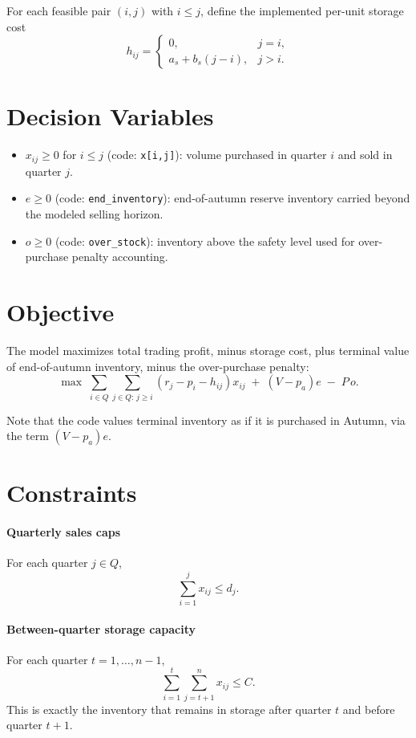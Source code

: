 For each feasible pair $(i,j)$ with $i \le j$, define the implemented per-unit storage cost
\[
h_{ij}=
\begin{cases}
0, & j=i,\\
a_s + b_s (j-i), & j>i.
\end{cases}
\]

\section*{Decision Variables}

\begin{itemize}
    \item $x_{ij} \ge 0$ for $i \le j$ (code: \texttt{x[i,j]}): volume purchased in quarter $i$ and sold in quarter $j$.
    \item $e \ge 0$ (code: \texttt{end\_inventory}): end-of-autumn reserve inventory carried beyond the modeled selling horizon.
    \item $o \ge 0$ (code: \texttt{over\_stock}): inventory above the safety level used for over-purchase penalty accounting.
\end{itemize}

\section*{Objective}

The model maximizes total trading profit, minus storage cost, plus terminal value of end-of-autumn inventory, minus the over-purchase penalty:
\[
\max \;
\sum_{i \in Q}\sum_{j \in Q:\, j \ge i}
\left(r_j - p_i - h_{ij}\right)x_{ij}
\;+\;
\left(V - p_a\right)e
\;-\;
P\,o .
\]

Note that the code values terminal inventory as if it is purchased in Autumn, via the term $(V-p_a)e$.

\section*{Constraints}

\paragraph{Quarterly sales caps}
For each quarter $j \in Q$,
\[
\sum_{i=1}^{j} x_{ij} \le d_j.
\]

\paragraph{Between-quarter storage capacity}
For each quarter $t=1,\dots,n-1$,
\[
\sum_{i=1}^{t}\sum_{j=t+1}^{n} x_{ij} \le C.
\]
This is exactly the inventory that remains in storage after quarter $t$ and before quarter $t+1$.

